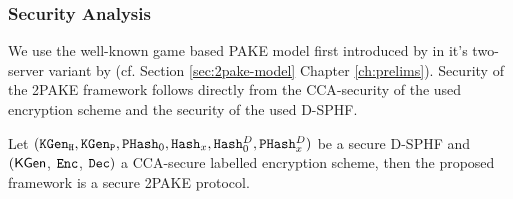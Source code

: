 %
%
%

\subsubsection{Security Analysis}
We use the well-known game based \ac{PAKE} model first introduced by \citet{Bellare2000} in it's two-server variant by \citet{Katz2012a} (cf. Section \ref{sec:2pake-model} Chapter \ref{ch:prelims}).
Security of the \ac{2PAKE} framework follows directly from the \ac{CCA}-security of the used encryption scheme and the security of the used \ac{D-SPHF}.

\begin{theorem}\label{theo:twopake}
Let $(\mathtt{KGen_H},\allowbreak\mathtt{KGen_P},\allowbreak\mathtt{PHash}_0,\allowbreak\mathtt{Hash}_x,\allowbreak\mathtt{Hash}_0^D,\allowbreak\mathtt{PHash}_x^D)$ be a secure \ac{D-SPHF} and $(\mathsf{KGen}$, $\mathtt{Enc}$, $\mathtt{Dec})$ a \ac{CCA}-secure labelled encryption scheme, then the proposed framework is a secure \ac{2PAKE} protocol.
\end{theorem}

